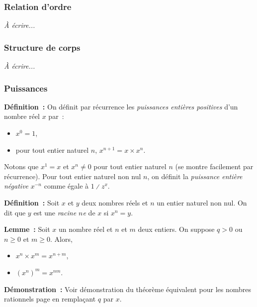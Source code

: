 \subsubsection{Relation d'ordre}

\emph{À écrire...}

\subsubsection{Structure de corps}

\emph{À écrire...}

\subsubsection{Puissances}

\noindent\textbf{Définition :} On définit par récurrence les \emph{puissances entières positives} d'un nombre réel $x$ par :
    \begin{itemize}[nosep]
        \item $x^0 = 1$,
        \item pour tout entier naturel $n$, $x^{n+1} = x \times x^n$.
    \end{itemize}
    Notons que $x^1 = x$ et $x^n \neq 0$ pour tout entier naturel $n$ (se montre facilement par récurrence).
    Pour tout entier naturel non nul $n$, on définit la \emph{puissance entière négative} $x^{-n}$ comme égale à $1 \divslash z^x$.

\medskip

\noindent\textbf{Définition :} Soit $x$ et $y$ deux nombres réels et $n$ un entier naturel non nul.
    On dit que $y$ est une \emph{racine $n$e} de $x$ si $x^n = y$.

\medskip

\noindent\textbf{Lemme :} Soit $x$ un nombre réel et $n$ et $m$ deux entiers. 
    On suppose $q > 0$ ou $n \geq 0$ et $m \geq 0$.
    Alors, 
    \begin{itemize}[nosep]
        \item $x^n \times x^m = x^{n+m}$,
        \item $(x^n)^m = x^{n m}$.
    \end{itemize}

\medskip

\noindent\textbf{Démonstration :} Voir démonstration du théorème équivalent pour les nombres rationnels page \pageref{demo:rel_puissances_q} en remplaçant $q$ par $x$.

